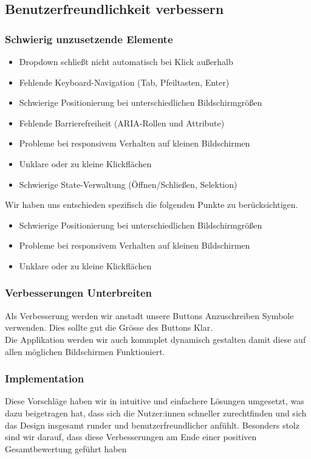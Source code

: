 \documentclass[10pt]{article}
\begin{document}
	
	
	
	\subsection{Benutzerfreundlichkeit verbessern}
	\subsubsection{Schwierig unzusetzende Elemente}
	\begin{itemize}
		\item 	Dropdown schließt nicht automatisch bei Klick außerhalb
		\item 	Fehlende Keyboard-Navigation (Tab, Pfeiltasten, Enter)
		\item 	Schwierige Positionierung bei unterschiedlichen Bildschirmgrößen
		\item 	Fehlende Barrierefreiheit (ARIA-Rollen und Attribute)
		\item 	Probleme bei responsivem Verhalten auf kleinen Bildschirmen
		\item 	Unklare oder zu kleine Klickflächen
		\item 	Schwierige State-Verwaltung (Öffnen/Schließen, Selektion)
	\end{itemize}
	Wir haben uns entschieden spezifisch die folgenden Punkte zu berücksichtigen.
	\begin{itemize}
		\item 	Schwierige Positionierung bei unterschiedlichen Bildschirmgrößen
		\item 	Probleme bei responsivem Verhalten auf kleinen Bildschirmen
		\item 	Unklare oder zu kleine Klickflächen
	\end{itemize}
	
	\subsubsection{Verbesserungen Unterbreiten}
	Als Verbesserung werden wir anstadt unsere Buttons Anzuschreiben Symbole verwenden. Dies sollte gut die Grösse des Buttons Klar.\\
	Die Applikation werden wir auch kommplet dynamisch gestalten damit diese auf allen möglichen Bildschirmen Funktioniert.
	
	\subsubsection{Implementation}
	Diese Vorschläge haben wir in intuitive und einfachere Lösungen umgesetzt, was dazu beigetragen hat, dass sich die Nutzer:innen schneller zurechtfinden und sich das Design insgesamt runder und benutzerfreundlicher anfühlt. Besonders stolz sind wir darauf, dass diese Verbesserungen am Ende einer positiven Gesamtbewertung geführt haben
	
\end{document}
